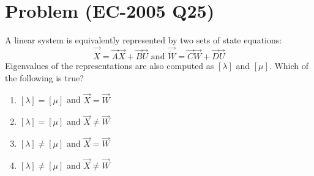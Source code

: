 \documentclass[journal,12pt,twocolumn]{IEEEtran}
\begin{document}
\section{Problem (EC-2005 Q25)}
A linear system is equivalently represented by two sets of state equations:
$$\vec{\dot X}=\vec{A}\vec{X}+\vec{B}\vec{U} \text{ and } \vec{\dot W}=\vec{C}\vec{W}+\vec{D}\vec{U}$$
Eigenvalues of the representations are also computed as $[\lambda]$ and $[\mu]$. Which of the following is true?
\begin{enumerate}
    \item $[\lambda]=[\mu]$ and $\vec{X}=\vec{W}$
    \item $[\lambda]=[\mu]$ and $\vec{X}\neq \vec{W}$
    \item $[\lambda]\neq [\mu]$ and $\vec{X}=\vec{W}$
    \item $[\lambda]\neq[\mu]$ and $\vec{X}\neq \vec{W}$
\end{enumerate}
\end{document}
